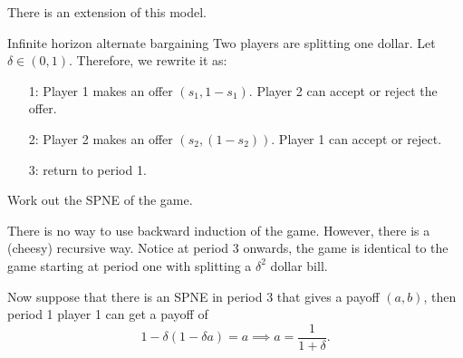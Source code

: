There is an extension of this model. 

\begin{aexample}{Infinite horizon alternate bargaining}{}
    Two players are splitting one dollar. 
    Let $\delta\in(0,1)$. Therefore, we rewrite it as:
    \begin{itemize}
        \item [1:] Player 1 makes an offer $(s_1,1-s_1)$. Player 2 can accept or reject the offer.
        \item [2:] Player 2 makes an offer $(s_2,(1-s_2))$. Player 1 can accept or reject.
        \item [3:] return to period 1. 
    \end{itemize}
    Work out the SPNE of the game.
\end{aexample}

There is no way to use backward induction of the game. However, there is a (cheesy) recursive way. Notice at period 3 onwards, the game is identical to the game starting at period one with splitting a $\delta^2$ dollar bill. 

Now suppose that there is an SPNE in period 3 that gives a payoff $(a,b)$, then period 1 player 1 can get a payoff of \[
1-\delta(1-\delta a)=a \implies a=\frac{1}{1+\delta}.
\]

